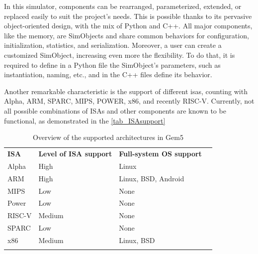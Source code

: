 In this simulator, components can be rearranged, parameterized, extended, or replaced easily to suit the project's needs. This is possible 
thanks to its pervasive object-oriented design, with the mix of Python and C++. All major components, like the memory, are SimObjects and 
share common behaviors for configuration, initialization, statistics, and serialization. Moreover, a user can create a customized SimObject, 
increasing even more the flexibility. To do that, it is required to define in a Python file the SimObject’s parameters, such as instantiation, 
naming, etc., and in the C++ files define its behavior.

Another remarkable characteristic is the support of different \glspl{isa}, counting with Alpha, ARM, SPARC, MIPS, POWER, x86, and recently 
RISC-V. Currently, not all possible combinations of ISAs and other components are known to be functional, as demonstrated in the 
\autoref{tab_ISAsupport}

\begin{table}[H]
\centering
\begin{tabular}{llll}
\cline{1-3}
\multicolumn{1}{|l|}{\cellcolor[HTML]{9B9B9B}\textbf{ISA}} & \multicolumn{1}{l|}{\cellcolor[HTML]{9B9B9B}\textbf{Level of ISA support}} & \multicolumn{1}{l|}{\cellcolor[HTML]{9B9B9B}\textbf{Full-system OS support}} &  \\ \cline{1-3}
\multicolumn{1}{|l|}{Alpha} & \multicolumn{1}{l|}{High} & \multicolumn{1}{l|}{Linux} &  \\ \cline{1-3}
\multicolumn{1}{|l|}{ARM} & \multicolumn{1}{l|}{High} & \multicolumn{1}{l|}{Linux, BSD, Android} &  \\ \cline{1-3}
\multicolumn{1}{|l|}{MIPS} & \multicolumn{1}{l|}{Low} & \multicolumn{1}{l|}{None} &  \\ \cline{1-3}
\multicolumn{1}{|l|}{Power} & \multicolumn{1}{l|}{Low} & \multicolumn{1}{l|}{None} &  \\ \cline{1-3}
\multicolumn{1}{|l|}{RISC-V} & \multicolumn{1}{l|}{Medium} & \multicolumn{1}{l|}{None} &  \\ \cline{1-3}
\multicolumn{1}{|l|}{SPARC} & \multicolumn{1}{l|}{Low} & \multicolumn{1}{l|}{None} &  \\ \cline{1-3}
\multicolumn{1}{|l|}{x86} & \multicolumn{1}{l|}{Medium} & \multicolumn{1}{l|}{Linux, BSD} &  \\ \cline{1-3}
 &  &  & 
\end{tabular}
\caption{Overview of the supported architectures in Gem5 \cite{hempelsimulation}}
\label{tab_ISAsupport}
\end{table}

